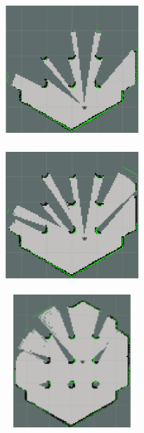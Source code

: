 {{		
				\begin{figure}[H]
			\captionsetup{width=.8\linewidth}
			\centering
			\begin{subfigure}[h]{.33\linewidth}
				\centering
				\includegraphics[scale=0.6, height =5cm, width=5cm]{Bilder/mapping_smpl_1.png}
				\label{pic:mapping_smpl_1}
			\end{subfigure}%
			\qquad %
			\begin{subfigure}[h]{.33\linewidth}
				\centering
				\includegraphics[scale=0.6, height =5cm, width=5cm]{Bilder/mapping_smpl_2.png}
				\label{pic:mapping_smpl_2}
			\end{subfigure}\hfill
			\begin{subfigure}[h]{.33\linewidth}
				\centering
				\includegraphics[scale=0.6, height =5cm, width=5cm]{Bilder/mapping_smpl_3.png}
				\label{pic:mapping_smpl_3}
			\end{subfigure}%

\end{figure}}}

